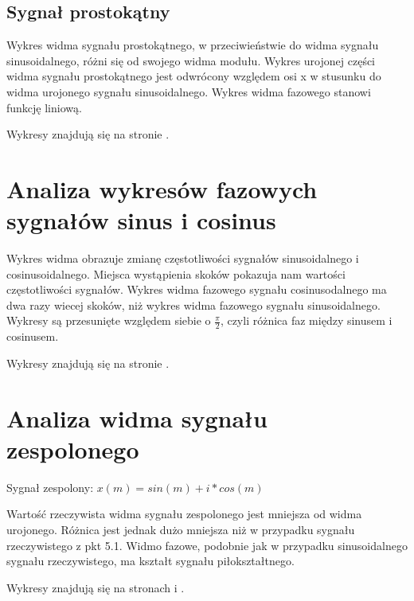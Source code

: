 \documentclass[wide,a4paper,titlepage,12pt]{mwart}
\begin{document}
		\subsection{Sygnał prostokątny}
		Wykres widma sygnału prostokątnego, w przeciwieństwie do widma sygnału sinusoidalnego, różni się od swojego widma modułu. Wykres urojonej części widma sygnału prostokątnego jest odwrócony względem osi x w stusunku do widma urojonego sygnału sinusoidalnego. Wykres widma fazowego stanowi funkcję liniową.
		
		Wykresy znajdują się na stronie \pageref{fig4}.
		
	\section{Analiza wykresów fazowych sygnałów sinus i cosinus}
		Wykres widma obrazuje zmianę częstotliwości sygnałów sinusoidalnego i cosinusoidalnego. Miejsca wystąpienia skoków pokazuja nam wartości częstotliwości sygnałów. Wykres widma fazowego sygnału cosinusodalnego ma dwa razy wiecej skoków, niż wykres widma fazowego sygnału sinusoidalnego. Wykresy są przesunięte względem siebie o $\frac{\pi}{2}$, czyli różnica faz między sinusem i cosinusem.
	
		Wykresy znajdują się na stronie \pageref{fig5}.
		
	\section{Analiza widma sygnału zespolonego}
		Sygnał zespolony: $x(m) = sin(m) + i*cos(m)$
		
		Wartość rzeczywista widma sygnału zespolonego jest mniejsza od widma urojonego. Różnica jest jednak dużo mniejsza niż w przypadku sygnału rzeczywistego z pkt 5.1. Widmo fazowe, podobnie jak w przypadku sinusoidalnego sygnału rzeczywistego, ma kształt sygnału piłokształtnego. 
		
		
		Wykresy znajdują się na stronach \pageref{fig6} i \pageref{fig7}.
\end{document}
